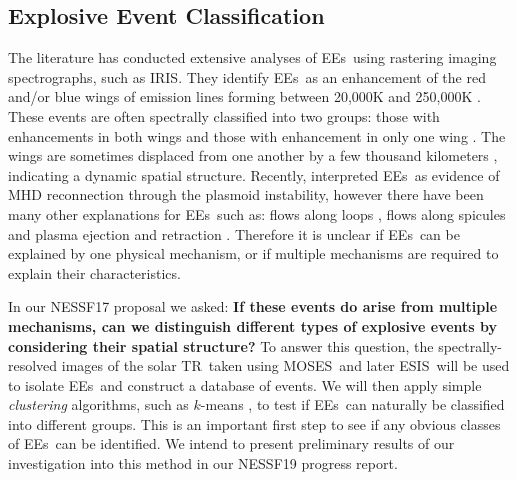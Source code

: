 \documentclass[10pt,letterpaper]{article}
\newcommand{\TR}{\ac{TR}}
\newcommand{\EEs}{\acp{EE}}
\newcommand{\MOSES}{\ac{MOSES}}
\newcommand{\ESIS}{\ac{ESIS}}
\newcommand{\IRIS}{\ac{IRIS}}
\begin{document}
		
		\subsection{Explosive Event Classification}
		
			The literature has conducted extensive analyses of \EEs\ using rastering imaging spectrographs, such as \IRIS.
			They identify \EEs\ as an enhancement of the red and/or blue wings of emission lines forming between 20,000K and 250,000K \citep{Moses1994}.
			These events are often spectrally classified into two groups: those with enhancements in both wings and those with enhancement in only one wing \citep{Dere1989}.
			The wings are sometimes displaced from one another by a few thousand kilometers \citep{Dere1994}, indicating a dynamic spatial structure.
			Recently, \cite{Innes2015} interpreted \EEs\ as evidence of  MHD reconnection through the plasmoid instability, however there have been many other explanations for \EEs\ such as: flows along loops \citep{Teriaca2004}, flows along spicules \citep{Wilhelm2000} and plasma ejection and retraction \citep{Huang2014}.
			Therefore it is unclear if \EEs\ can be explained by one physical mechanism, or if multiple mechanisms are required to explain their characteristics.
			
			In our NESSF17 proposal we asked: \textbf{If these events do arise from multiple mechanisms, can we distinguish different types of explosive events by considering their spatial structure?}
			To answer this question, the spectrally-resolved images of the solar \TR\ taken using \MOSES\ and later \ESIS\ will be used to isolate \EEs\ and construct a database of events.
			We will then apply simple \textit{clustering} algorithms, such as $k$-means \citep{Macqueen1967}, to test if \EEs\ can naturally be classified into different groups.
			This is an important first step to see if any obvious classes of \EEs\ can be identified.
			We intend to present preliminary results of our investigation into this method in our NESSF19 progress report.
			
	
	
	\begin{landscape}
		
	\end{landscape}
	
	
	
\end{document}
